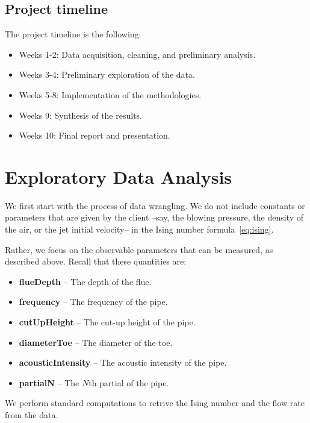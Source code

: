 \documentclass{psu-report}
\begin{document}
\section{Project timeline}

The project timeline is the following:
\begin{itemize}
    \item Weeks 1-2: Data acquisition, cleaning, and preliminary analysis.
    \item Weeks 3-4: Preliminary exploration of the data.
    \item Weeks 5-8: Implementation of the methodologies.
    \item Weeks 9: Synthesis of the results.
    \item Weeks 10: Final report and presentation.
\end{itemize}




\chapter{Exploratory Data Analysis}

We first start with the process of data wrangling.
We do not include constants or parameters that are given by the client --say,
the blowing pressure, the density of the air, or the jet initial velocity-- in
the Ising number formula~\ref{eq:ising}.

Rather, we focus on the observable parameters that can be measured, as described
above.
Recall that these quantities are: 
\begin{itemize}
    \item \textbf{flueDepth} -- The depth of the flue.
    \item \textbf{frequency} -- The frequency of the pipe.
    \item \textbf{cutUpHeight} -- The cut-up height of the pipe.
    \item \textbf{diameterToe} -- The diameter of the toe.
    \item \textbf{acousticIntensity} -- The acoustic intensity of the pipe.
    \item \textbf{partialN} -- The \(N\)th partial of the pipe.
\end{itemize}
We perform standard computations to retrive the Ising number and the flow rate
from the data.
\end{document}
